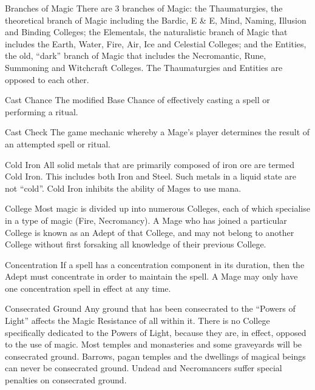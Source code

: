 \begin{multicols*}{3}
\begin{Description}
\item[Branches of Magic] There are 3 branches of Magic: the
Thaumaturgies, the theoretical branch of Magic including the Bardic, E
\& E, Mind, Naming, Illusion and Binding Colleges; the Elementals, the
naturalistic branch of Magic that includes the Earth, Water, Fire,
Air, Ice and Celestial Colleges; and the Entities, the old, ``dark''
branch of Magic that includes the Necromantic, Rune, Summoning and
Witchcraft Colleges. The Thaumaturgies and Entities are opposed to
each other.  

\item[Cast Chance] The modified Base Chance of effectively casting a
spell or performing a ritual.

\item[Cast Check] The game mechanic whereby a Mage's player determines
the result of an attempted spell or ritual.

\item[Cold Iron] All solid metals that are primarily composed of iron
ore are termed Cold Iron. This includes both Iron and Steel. Such
metals in a liquid state are not ``cold''. Cold Iron inhibits the
ability of Mages to use mana.

\item[College] Most magic is divided up into numerous Colleges, each
of which specialise in a type of magic (\eg Fire, Necromancy). A Mage
who has joined a particular College is known as an Adept of that
College, and may not belong to another College without first forsaking
all knowledge of their previous College.

\item[Concentration] If a spell has a concentration component in its
duration, then the Adept must concentrate in order to maintain the
spell. A Mage may only have one concentration spell in effect at any
time.

\item[Consecrated Ground] Any ground that has been consecrated to the
``Powers of Light'' affects the Magic Resistance of all within
it. There is no College specifically dedicated to the Powers of Light,
because they are, in effect, opposed to the use of magic. Most temples
and monasteries and some graveyards will be consecrated
ground. Barrows, pagan temples and the dwellings of magical beings can
never be consecrated ground. Undead and Necromancers suffer special
penalties on consecrated ground.


\end{Description}
\end{multicols*}
